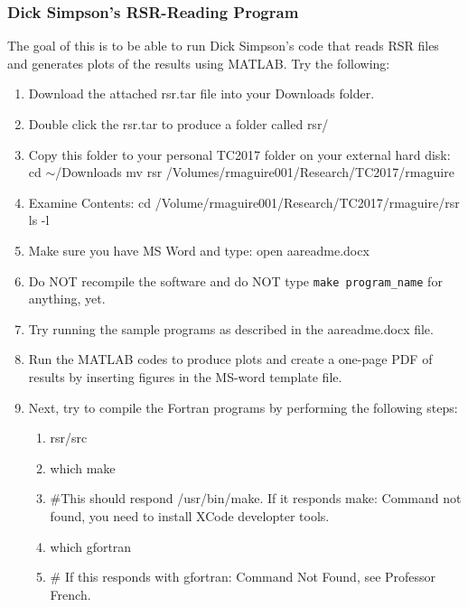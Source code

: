 \documentclass[crop=false,class=article,oneside]{standalone}
\begin{document}
        \subsubsection{Dick Simpson's RSR-Reading Program}
            The goal of this is to be able to run Dick Simpson's code
            that reads RSR files and generates plots of the results
            using MATLAB. Try the following:
            \begin{enumerate}
                \item Download the attached rsr.tar file into
                      your Downloads folder.
                \item Double click the rsr.tar to produce a
                      folder called rsr/
                \item Copy this folder to your personal TC2017
                      folder on your external hard disk:
                \subitem cd $\sim$/Downloads
                \subitem mv rsr
                         /Volumes/rmaguire001/Research/TC2017/rmaguire
                \item Examine Contents:
                \subitem cd
                        /Volume/rmaguire001/Research/TC2017/rmaguire/rsr
                \subitem ls -l
                \item Make sure you have MS Word and type:
                \subitem open aareadme.docx
                \item Do NOT recompile the software and do NOT
                      type \texttt{make program\_name} for anything, yet.
                \item Try running the sample programs as described in 
                      the aareadme.docx file.
                \item Run the MATLAB codes to produce plots and create a one-page PDF of results by inserting figures in the MS-word template file.
                \item Next, try to compile the Fortran programs by performing the following steps:
                \begin{enumerate}
                    \item[] rsr/src
                    \item[] which make
                    \item[] \#This should respond /usr/bin/make. If it responds make: Command not found, you need to install XCode developter tools.
                    \item[] which gfortran
                    \item[] \# If this responds with gfortran: Command Not Found, see Professor French.

\end{enumerate}
\end{enumerate}
\end{document}
